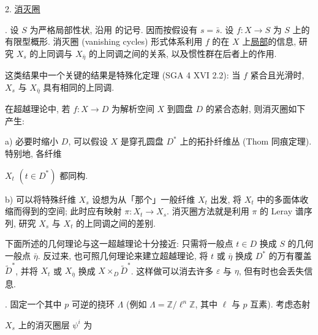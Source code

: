 

2. \underline{消灭圈}

. 设 $S$ 为严格局部性状, 沿用  的记号. 因而按假设有 $s=\bar s$. 设 $f:X\longrightarrow S$ 为 $S$ 上的有限型概形. 消灭圈 (vanishing cycles) 形式体系利用 $f$ 的在 $X$ 上\underline{局部}的信息, 研究 $X_s$ 的上同调与 $X_{\bar\eta}$ 的上同调之间的关系, 以及惯性群在后者上的作用.

这类结果中一个关键的结果是特殊化定理 (SGA 4 XVI 2.2): 当 $f$ 紧合且光滑时, $X_s$ 与 $X_{\bar\eta}$ 具有相同的上同调.

在超越理论中, 若 $f:X\longrightarrow D$ 为解析空间 $X$ 到圆盘 $D$ 的紧合态射, 则消灭圈如下产生:

a) 必要时缩小 $D$, 可以假设 $X$ 是穿孔圆盘 $D^*$ 上的拓扑纤维丛 (Thom 同痕定理). 特别地, 各纤维


$X_t$ $(t\in D^*)$ 都同构.

b) 可以将特殊纤维 $X_s$ 设想为从「那个」一般纤维 $X_t$ 出发, 将 $X_t$ 中的多面体收缩而得到的空间; 此时应有映射 $\pi:X_t\longrightarrow X_s$. 消灭圈方法就是利用 $\pi$ 的 Leray 谱序列, 研究 $X_s$ 与 $X_t$ 的上同调之间的差别.

下面所述的几何理论与这一超越理论十分接近: 只需将一般点 $t\in D$ 换成 $S$ 的几何一般点 $\bar\eta$. 反过来, 也可照几何理论来建立超越理论, 将 $t$ 或 $\bar\eta$ 换成 $D^*$ 的万有覆盖 $\widetilde D^*$, 并将 $X_t$ 或 $X_{\bar\eta}$ 换成 $X\times_D\widetilde D^*$. 这样做可以消去许多 $\varepsilon$ 与 $\eta$, 但有时也会丢失信息.

. 固定一个其中 $p$ 可逆的挠环 $\Lambda$ (例如 $\Lambda=\mathbb Z/\ell^n\mathbb Z$, 其中 $\ell$ 与 $p$ 互素). 考虑态射

\begin{center}
\end{center}
$X_s$ 上的消灭圈层 $\psi^i$ 为

